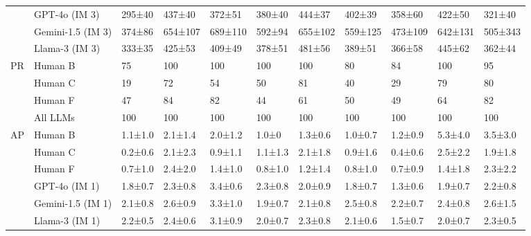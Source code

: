 \begin{table*}[]
\begin{tabular}{lllllllllll}
   &     GPT-4o (IM 3) &  295{\tiny±40} &  437{\tiny±40} &   372{\tiny±51} &  380{\tiny±40} &  444{\tiny±37} &  402{\tiny±39} &   358{\tiny±60} &  422{\tiny±50} &  321{\tiny±40} \\
   & Gemini-1.5 (IM 3) &  374{\tiny±86} & 654{\tiny±107} &  689{\tiny±110} &  592{\tiny±94} & 655{\tiny±102} & 559{\tiny±125} &  473{\tiny±109} & 642{\tiny±131} & 505{\tiny±343} \\ 
   &    Llama-3 (IM 3) &  333{\tiny±35} &  425{\tiny±53} &   409{\tiny±49} &  378{\tiny±51} &  481{\tiny±56} &  389{\tiny±51} &   366{\tiny±58} &  445{\tiny±62} &  362{\tiny±44} \\ \midrule \midrule

  PR &                Human B &             75 &            100 &             100 &            100 &            100 &             80 &              84 &            100 &             95 \\
   &                Human C &             19 &             72 &              54 &             50 &             81 &             40 &              29 &             79 &             80 \\
   &                Human F &             47 &             84 &              82 &             44 &             61 &             50 &              49 &             64 &             82 \\ 
   &                 All LLMs &           100 &           100 &            100 &           100 &           100 &           100 &            100 &           100 &           100 \\ \midrule \midrule
   
  AP &                Human B & 1.1{\tiny±1.0} & 2.1{\tiny±1.4} &  2.0{\tiny±1.2} &   1.0{\tiny±0} & 1.3{\tiny±0.6} & 1.0{\tiny±0.7} &  1.2{\tiny±0.9} & 5.3{\tiny±4.0} & 3.5{\tiny±3.0} \\
   &                Human C & 0.2{\tiny±0.6} & 2.1{\tiny±2.3} &  0.9{\tiny±1.1} & 1.1{\tiny±1.3} & 2.1{\tiny±1.8} & 0.9{\tiny±1.6} &  0.4{\tiny±0.6} & 2.5{\tiny±2.2} & 1.9{\tiny±1.8} \\
   &                Human F & 0.7{\tiny±1.0} & 2.4{\tiny±2.0} &  1.4{\tiny±1.0} & 0.8{\tiny±1.0} & 1.2{\tiny±1.4} & 0.8{\tiny±1.0} &  0.7{\tiny±0.9} & 1.4{\tiny±1.8} & 2.3{\tiny±2.2} \\ [0.15cm]
   
   &     GPT-4o (IM 1) & 1.8{\tiny±0.7} & 2.3{\tiny±0.8} &  3.4{\tiny±0.6} & 2.3{\tiny±0.8} & 2.0{\tiny±0.9} & 1.8{\tiny±0.7} &  1.3{\tiny±0.6} & 1.9{\tiny±0.7} & 2.2{\tiny±0.8} \\
   & Gemini-1.5 (IM 1) & 2.1{\tiny±0.8} & 2.6{\tiny±0.9} &  3.3{\tiny±1.0} & 1.9{\tiny±0.7} & 2.1{\tiny±0.8} & 2.5{\tiny±0.8} &  2.2{\tiny±0.7} & 2.4{\tiny±0.8} & 2.6{\tiny±1.5} \\
   &    Llama-3 (IM 1) & 2.2{\tiny±0.5} & 2.4{\tiny±0.6} &  3.1{\tiny±0.9} & 2.0{\tiny±0.7} & 2.3{\tiny±0.8} & 2.1{\tiny±0.6} &  1.5{\tiny±0.7} & 2.0{\tiny±0.7} & 2.3{\tiny±0.5} \\ [0.15cm]


\end{tabular}
\end{table*}
